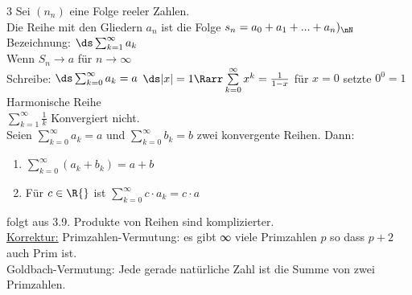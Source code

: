 %
\setcounter{chapter}3
%
Sei $(n_n)$ eine Folge reeler Zahlen.\\
Die Reihe mit den Gliedern $a_n$ ist die Folge $s_n = a_0 + a_1 + ... + a_n)_\nN$ \\
Bezeichnung: $\ds\sum_{k=1}^{\infty} a_k$\\
Wenn $S_n \to a$ für $n \to \infty$\\
Schreibe: $\ds\sum_{k = 0}^{\infty} a_k = a$
$\ds|x| = 1 \Rarr \sum\limits_{k = 0}^{\infty} x^k = \frac{1}{1-x}$ für $x = 0$ setzte $0^0 = 1$\\[4pt]
Harmonische Reihe\\
$\displaystyle\sum\limits_{k = 1}^{\infty} \frac{1}{k}$ Konvergiert nicht.\\
Seien $\sum\limits_{k = 0}^{\infty} a_k = a$ und $\sum\limits_{k = 0}^{\infty} b_k = b$ zwei konvergente Reihen. Dann:
\begin{enumerate}
\item{$\sum\limits_{k = 0}^{\infty} (a_k + b_k) = a + b$}
\item{Für $c \in \R{}$ ist $\sum\limits_{k = 0}^{\infty} c \cdot a_k = c \cdot a$}
\end{enumerate}
\bew
folgt aus 3.9.
\bem
Produkte von Reihen sind komplizierter.\\
\underline{Korrektur:}
Primzahlen-Vermutung: es gibt ∞ viele Primzahlen $p$ so dass $p + 2$ auch Prim ist.\\
Goldbach-Vermutung: Jede gerade natürliche Zahl ist die Summe von zwei Primzahlen.\\
